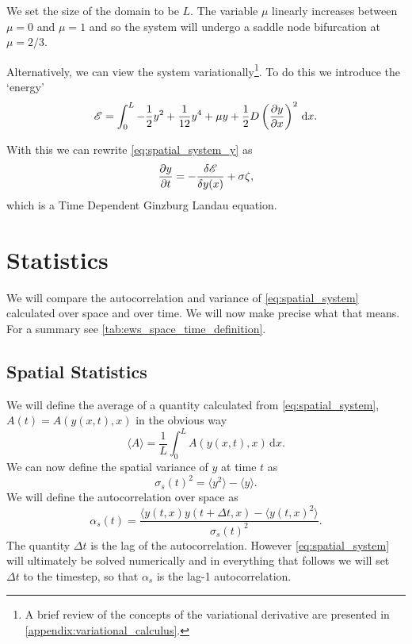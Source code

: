 We set the size of the domain to be $L$. The variable $\mu$ linearly increases between $\mu = 0$ and $\mu = 1$ and so the system will undergo a saddle node
bifurcation at $\mu = 2/3$.

Alternatively, we can view the system variationally\footnote{A brief review of the concepts of the variational derivative are presented in \cref{appendix:variational_calculus}.}.
To do this we introduce the `energy'
\begin{equation}
  \label{eq:spatial_system_energy}
  \mathscr{E} = \int_0^L -\frac{1}{2}y^2 + \frac{1}{12}y^4 + \mu y + \frac{1}{2}D\left(\pdv{y}{x}\right)^2\,\mathrm{d}{x}.
\end{equation}

With this we can rewrite \cref{eq:spatial_system_y} as
\begin{equation}
  \label{eq:spatial_system_y_variational}
    \pdv{y}{t} = -\fdv{\mathscr{E}}{y(x)}  + \sigma\zeta, 
\end{equation}
which is a Time Dependent Ginzburg Landau equation\cite{goldenfeld1992}.

\section{Statistics}
We will compare the autocorrelation and variance of \cref{eq:spatial_system} calculated over space and over time. We will now
make precise what that means. For a summary see \cref{tab:ews_space_time_definition}.

\subsection{Spatial Statistics}

We will define the average of a quantity calculated from \cref{eq:spatial_system}, $A(t) = A(y(x,t),x)$ in the obvious way
\begin{equation}
  \label{eq:definition_of_average}
  \langle A \rangle = \frac{1}{L}\int_0^L A(y(x,t),x) \,\mathrm{d}x.
\end{equation}
We can now define the spatial variance of $y$ at time $t$ as
\begin{equation}
  \label{eq:spatial_variance}
  \sigma_s(t)^2 = \langle y^2 \rangle - \langle y \rangle.
\end{equation}
We will define the autocorrelation over space as
\begin{equation}
  \label{eq:spatial_autocorrelation}
  \alpha_s(t) = \frac{\langle y(t,x)y(t+\Delta t,x) - \langle y(t,x)^2 \rangle }{\sigma_s(t)^2}.
\end{equation}
The quantity $\Delta t$ is the lag of the autocorrelation. However \cref{eq:spatial_system} will ultimately be solved numerically and
in everything that follows we will set $\Delta t$ to the timestep, so that $\alpha_s$ is the lag-1 autocorrelation.

